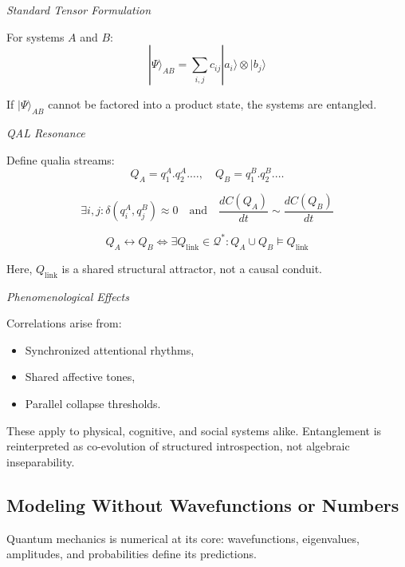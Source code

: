\documentclass[11pt]{article}
\numberwithin{equation}{section} %
\begin{document}
\textit{Standard Tensor Formulation}

For systems \( A \) and \( B \):
\begin{equation}
|\Psi\rangle_{AB} = \sum_{i,j} c_{ij} |a_i\rangle \otimes |b_j\rangle
\end{equation}

If \( |\Psi\rangle_{AB} \) cannot be factored into a product state, the systems are entangled.

\bigskip

\textit{QAL Resonance}

Define qualia streams:
\begin{equation}
Q_A = q_1^A . q_2^A . \dots, \quad Q_B = q_1^B . q_2^B . \dots
\end{equation}

\begin{equation}
\exists i,j : \delta(q_i^A, q_j^B) \approx 0 \quad \text{and} \quad \frac{dC(Q_A)}{dt} \sim \frac{dC(Q_B)}{dt}
\end{equation}

\begin{equation}
Q_A \leftrightarrow Q_B \iff \exists Q_{\text{link}} \in \mathcal{Q}^* : Q_A \cup Q_B \models Q_{\text{link}}
\end{equation}

Here, \( Q_{\text{link}} \) is a shared structural attractor, not a causal conduit.

\bigskip

\textit{Phenomenological Effects}

Correlations arise from:
\begin{itemize}
  \item Synchronized attentional rhythms,
  \item Shared affective tones,
  \item Parallel collapse thresholds.
\end{itemize}

These apply to physical, cognitive, and social systems alike. Entanglement is reinterpreted as co-evolution of structured introspection, not algebraic inseparability.

\subsection{Modeling Without Wavefunctions or Numbers}

Quantum mechanics is numerical at its core: wavefunctions, eigenvalues, amplitudes, and probabilities define its predictions.
\end{document}
